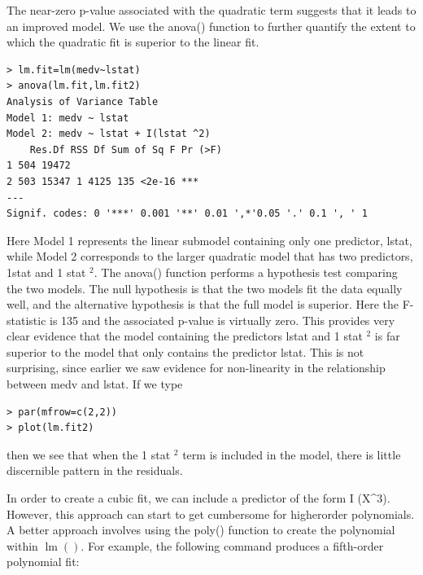 \documentclass[10pt]{article}
\begin{document}
The near-zero p-value associated with the quadratic term suggests that it leads to an improved model. We use the anova() function to further quantify the extent to which the quadratic fit is superior to the linear fit.

\begin{verbatim}
> lm.fit=lm(medv~lstat)
> anova(lm.fit,lm.fit2)
Analysis of Variance Table
Model 1: medv ~ lstat
Model 2: medv ~ lstat + I(lstat ^2)
    Res.Df RSS Df Sum of Sq F Pr (>F)
1 504 19472
2 503 15347 1 4125 135 <2e-16 ***
---
Signif. codes: 0 '***' 0.001 '**' 0.01 ',*'0.05 '.' 0.1 ', ' 1
\end{verbatim}

Here Model 1 represents the linear submodel containing only one predictor, lstat, while Model 2 corresponds to the larger quadratic model that has two predictors, 1stat and 1 stat ${ }^{2}$. The anova() function performs a hypothesis test comparing the two models. The null hypothesis is that the two models fit the data equally well, and the alternative hypothesis is that the full model is superior. Here the F-statistic is 135 and the associated p-value is virtually zero. This provides very clear evidence that the model containing the predictors lstat and 1 stat ${ }^{2}$ is far superior to the model that only contains the predictor lstat. This is not surprising, since earlier we saw evidence for non-linearity in the relationship between medv and lstat. If we type

\begin{verbatim}
> par(mfrow=c(2,2))
> plot(lm.fit2)
\end{verbatim}

then we see that when the 1 stat $^{2}$ term is included in the model, there is little discernible pattern in the residuals.

In order to create a cubic fit, we can include a predictor of the form I (X\^{}3). However, this approach can start to get cumbersome for higherorder polynomials. A better approach involves using the poly() function to create the polynomial within $\operatorname{lm}()$. For example, the following command produces a fifth-order polynomial fit:
\end{document}
